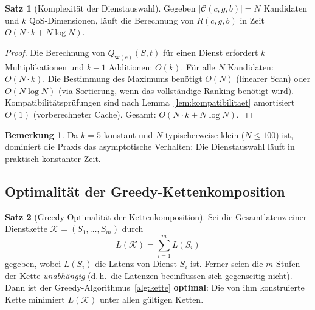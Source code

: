 ﻿\documentclass[a4paper,12pt]{article}
\theoremstyle{definition}
\newtheorem{satz}{Satz}
\newtheorem{bemerkung}{Bemerkung}
\begin{document}
\begin{satz}[Komplexität der Dienstauswahl]
\label{satz:komplexitaet_routing}
Gegeben $|\mathcal{C}(c,g,b)| = N$ Kandidaten und $k$ QoS-Dimensionen, läuft die Berechnung von $R(c,g,b)$ in Zeit $O(N \cdot k + N \log N)$.
\end{satz}

\begin{proof}
Die Berechnung von $Q_{\mathbf{w}(c)}(S, t)$ für einen Dienst erfordert $k$ Multiplikationen und $k-1$ Additionen: $O(k)$. Für alle $N$ Kandidaten: $O(N \cdot k)$. Die Bestimmung des Maximums benötigt $O(N)$ (linearer Scan) oder $O(N \log N)$ (via Sortierung, wenn das vollständige Ranking benötigt wird). Kompatibilitätsprüfungen sind nach Lemma~\ref{lem:kompatibilitaet} amortisiert $O(1)$ (vorberechneter Cache). Gesamt: $O(N \cdot k + N \log N)$. $
$
\end{proof}

\begin{bemerkung}
Da $k = 5$ konstant und $N$ typischerweise klein ($N \leq 100$) ist, dominiert die Praxis das asymptotische Verhalten: Die Dienstauswahl läuft in praktisch konstanter Zeit.
\end{bemerkung}

\subsection{Optimalität der Greedy-Kettenkomposition}

\begin{satz}[Greedy-Optimalität der Kettenkomposition]
\label{satz:optimalitaet_kette}
Sei die Gesamtlatenz einer Dienstkette $\mathcal{K} = (S_1, \ldots, S_m)$ durch
\[
L(\mathcal{K}) = \sum_{i=1}^m L(S_i)
\]
gegeben, wobei $L(S_i)$ die Latenz von Dienst $S_i$ ist. Ferner seien die $m$ Stufen der Kette \emph{unabhängig} (d.\,h.\ die Latenzen beeinflussen sich gegenseitig nicht). Dann ist der Greedy-Algorithmus~\ref{alg:kette} \textbf{optimal}: Die von ihm konstruierte Kette minimiert $L(\mathcal{K})$ unter allen gültigen Ketten.
\end{satz}
\end{document}
